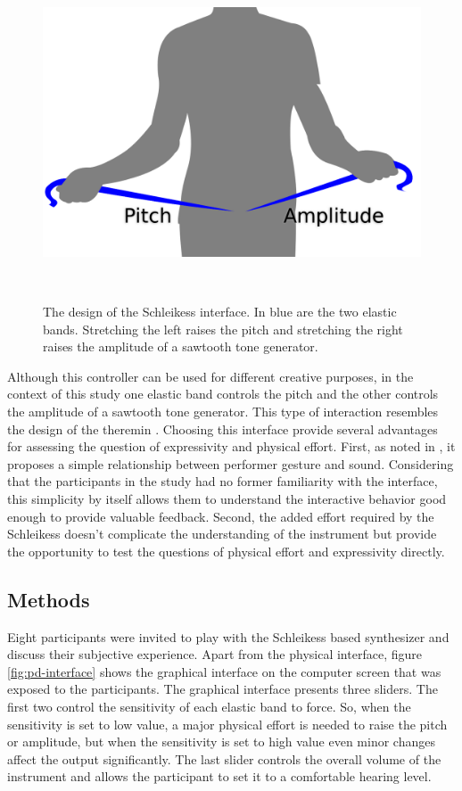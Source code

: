 \documentclass{sigchi}
\begin{document}
\begin{figure}
  \centering
  \includegraphics[width=0.9\columnwidth]{figures/schleikess}
  \caption{The design of the Schleikess interface. In blue are the two elastic bands. Stretching the left raises the pitch and stretching the right raises the amplitude of a sawtooth tone generator.}~\label{fig:schleikess}
\end{figure}

Although this controller can be used for different creative purposes, in the context of this study one elastic band controls the pitch and the other controls the amplitude of a sawtooth tone generator.
This type of interaction resembles the design of the theremin \cite{Theremin1996}.
Choosing this interface provide several advantages for assessing the question of expressivity and physical effort.
First, as noted in \cite{Fyans2010}, it proposes a simple relationship between performer gesture and sound.
Considering that the participants in the study had no former familiarity with the interface, this simplicity by itself allows them to understand the interactive behavior good enough to provide valuable feedback.
Second, the added effort required by the Schleikess doesn't complicate the understanding of the instrument but provide the opportunity to test the questions of physical effort and expressivity directly.

\subsection{Methods}

Eight participants were invited to play with the Schleikess based synthesizer and discuss their subjective experience.
Apart from the physical interface, figure \ref{fig:pd-interface} shows the graphical interface on the computer screen that was exposed to the participants.
The graphical interface presents three sliders.
The first two control the sensitivity of each elastic band to force.
So, when the sensitivity is set to low value, a major physical effort is needed to raise the pitch or amplitude, but when the sensitivity is set to high value even minor changes affect the output significantly.
The last slider controls the overall volume of the instrument and allows the participant to set it to a comfortable hearing level.
\end{document}
